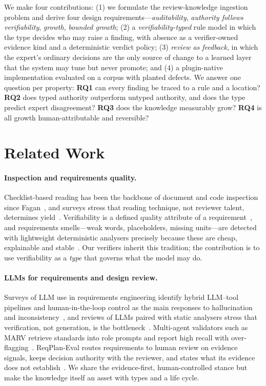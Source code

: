 \documentclass{IOS-Book-Article}
\begin{document}
We make four contributions: (1) we formulate the review-knowledge ingestion problem and derive four design requirements---\emph{auditability}, \emph{authority follows verifiability}, \emph{growth}, \emph{bounded growth}; (2) a \emph{verifiability-typed} rule model in which the type decides who may raise a finding, with absence as a verifier-owned evidence kind and a deterministic verdict policy; (3) \emph{review as feedback}, in which the expert's ordinary decisions are the only source of change to a learned layer that the system may tune but never promote; and (4) a plugin-native implementation evaluated on a corpus with planted defects. We answer one question per property: \textbf{RQ1} can every finding be traced to a rule and a location? \textbf{RQ2} does typed authority outperform untyped authority, and does the type predict expert disagreement? \textbf{RQ3} does the knowledge measurably grow? \textbf{RQ4} is all growth human-attributable and reversible?

\section{Related Work}

\paragraph{Inspection and requirements quality.}
Checklist-based reading has been the backbone of document and code inspection since Fagan~\cite{fagan1976}, and surveys stress that reading technique, not reviewer talent, determines yield~\cite{lait2000}. Verifiability is a defined quality attribute of a requirement~\cite{iso29148,genova2013}, and requirements smells---weak words, placeholders, missing units---are detected with lightweight deterministic analysers precisely because these are cheap, explainable and stable~\cite{femmer2017}. Our verifiers inherit this tradition; the contribution is to use verifiability as a \emph{type} that governs what the model may do.

\paragraph{LLMs for requirements and design review.}
Surveys of LLM use in requirements engineering identify hybrid LLM--tool pipelines and human-in-the-loop control as the main responses to hallucination and inconsistency~\cite{hemmat2025,huang2025hall}, and reviews of LLMs paired with static analysers stress that verification, not generation, is the bottleneck~\cite{dolcetti2025}. Multi-agent validators such as MARV retrieve standards into role prompts and report high recall with over-flagging~\cite{chinnam2025}. ReqPlan-Eval routes requirements to human review on evidence signals, keeps decision authority with the reviewer, and states what its evidence does not establish~\cite{alsawalqah2026}. We share the evidence-first, human-controlled stance but make the knowledge itself an asset with types and a life cycle.
\end{document}
